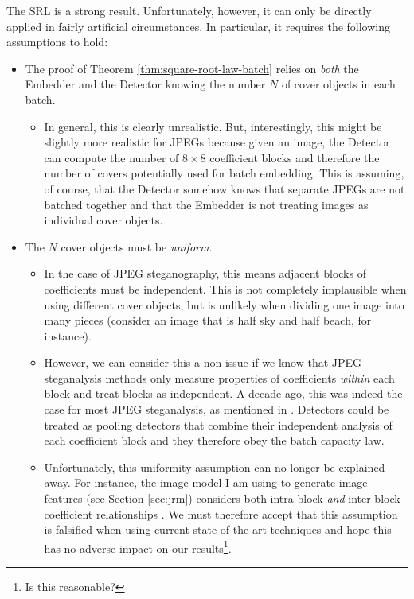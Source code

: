 \documentclass[11pt,a4paper,twoside,openright]{report}
\begin{document}
The SRL is a strong result. Unfortunately, however, it can only be directly applied in fairly artificial circumstances. In particular, it requires the following assumptions to hold:
\begin{itemize}

	\item The proof of Theorem \ref{thm:square-root-law-batch} relies on \textit{both} the Embedder and the Detector knowing the number $N$ of cover objects in each batch.
		\begin{itemize}
			\item In general, this is clearly unrealistic. But, interestingly, this might be slightly more realistic for JPEGs because given an image, the Detector can compute the number of $8\times8$ coefficient blocks and therefore the number of covers potentially used for batch embedding. This is assuming, of course, that the Detector somehow knows that separate JPEGs are not batched together and that the Embedder is not treating images as individual cover objects.
		\end{itemize}
	
	\item The $N$ cover objects must be \textit{uniform}.
		\begin{itemize}
			\item In the case of JPEG steganography, this means adjacent blocks of coefficients must be independent. This is not completely implausible when using different cover objects, but is unlikely when dividing one image into many pieces (consider an image that is half sky and half beach, for instance).
			\item However, we can consider this a non-issue if we know that JPEG steganalysis methods only measure properties of coefficients \textit{within} each block and treat blocks as independent. A decade ago, this was indeed the case for most JPEG steganalysis, as mentioned in \cite{2008-paper}. Detectors could be treated as pooling detectors that combine their independent analysis of each coefficient block and they therefore obey the batch capacity law.
			\item Unfortunately, this uniformity assumption can no longer be explained away. For instance, the image model I am using to generate image features (see Section \ref{sec:jrm}) considers both intra-block \textit{and} inter-block coefficient relationships \cite{jrm-paper}. We must therefore accept that this assumption is falsified when using current state-of-the-art techniques and hope this has no adverse impact on our results\footnote{Is this reasonable?}.
		\end{itemize}


\end{itemize}
\end{document}
